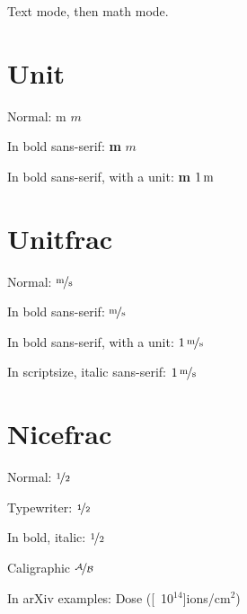 \documentclass{article}
\begin{document}
Text mode, then math mode.

\section{Unit}
Normal: \unit{m} $\unit{m}$

In bold sans-serif:
{\sffamily\bfseries\unit{m} }
{\sffamily\bfseries$\unit{m}$}

In bold sans-serif, with a unit:
{\sffamily\bfseries\unit[1]{m}}
{\sffamily\bfseries$\unit[1]{m}$}

\section{Unitfrac}
Normal:  $\unitfrac{m}{s}$

In bold sans-serif:
{\sffamily\bfseries{}}
{\sffamily\bfseries$\unitfrac{m}{s}$}

In bold sans-serif, with a unit:
{\sffamily\bfseries{}}
{\sffamily\bfseries$\unitfrac[1]{m}{s}$}

In scriptsize, italic sans-serif:
{\scriptsize\sffamily\itshape{}}
{\scriptsize\sffamily\itshape$\unitfrac[1]{m}{s}$}


\section{Nicefrac}
Normal:  $\nicefrac{1}{2}$

Typewriter:  $\nicefrac[\texttt]{1}{2}$

In bold, italic:
{\bfseries\itshape{}}
{\bfseries\itshape$\nicefrac{1}{2}$}

Caligraphic $\nicefrac[\mathcal]{A}{B}$

In arXiv examples:
Dose (\unit[10$^{14}$]{ions/cm$^2$)}%
\end{document}

